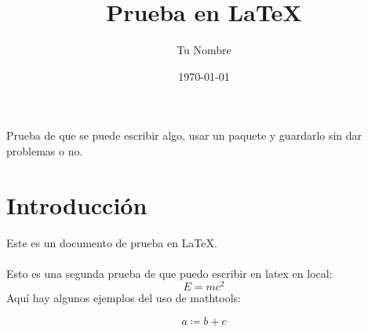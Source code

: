 \documentclass{article}
\title{Prueba en LaTeX}
\author{Tu Nombre}
\date{\today}
\begin{document}
\maketitle
Prueba de que se puede escribir algo, usar un paquete y guardarlo sin dar problemas o no.
\section{Introducción}
Este es un documento de prueba en LaTeX.\\\\
Esto es una segunda prueba de que puedo escribir en latex en local:
\begin{equation*}
    E = mc^2
\end{equation*}
Aquí hay algunos ejemplos del uso de mathtools:

\[
  a \coloneqq b + c  %
\]
\end{document}
